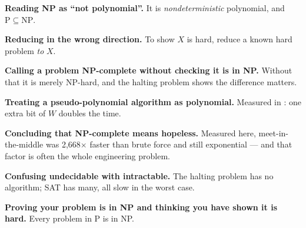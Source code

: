 \begin{pitfall}
\begin{tight}
  \item \textbf{Reading NP as ``not polynomial''.} It is
        \emph{nondeterministic} polynomial, and $\mathrm{P} \subseteq
        \mathrm{NP}$.
  \item \textbf{Reducing in the wrong direction.} To show $X$ is hard, reduce a
        known hard problem \emph{to} $X$.
  \item \textbf{Calling a problem NP-complete without checking it is in NP.}
        Without that it is merely NP-hard, and the halting problem shows the
        difference matters.
  \item \textbf{Treating a pseudo-polynomial algorithm as polynomial.}
        Measured in : one extra bit of $W$ doubles the time.
  \item \textbf{Concluding that NP-complete means hopeless.} Measured here,
        meet-in-the-middle was 2{,}668$\times$ faster than brute force and
        still exponential --- and that factor is often the whole engineering
        problem.
  \item \textbf{Confusing undecidable with intractable.} The halting problem has
        no algorithm; SAT has many, all slow in the worst case.
  \item \textbf{Proving your problem is in NP and thinking you have shown it is
        hard.} Every problem in P is in NP.
\end{tight}
\end{pitfall}


